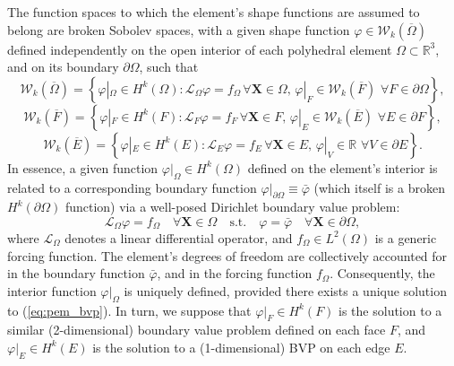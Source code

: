 	The function spaces to which the element's shape functions are assumed to belong are broken Sobolev spaces, with a given shape function $\varphi \in \mathcal{W}_k (\overline{\Omega})$ defined independently on the open interior of each polyhedral element $\Omega \subset \mathbb{R}^3$, and on its boundary $\partial \Omega$, such that
	\begin{equation}
		\mathcal{W}_k (\overline{\Omega}) = \left\{ \varphi|_{\Omega} \in H^k (\Omega) : \mathcal{L}_{\Omega} \varphi = f_{\Omega}  \, \forall \bm{X} \in \Omega, \, \varphi|_{F} \in \mathcal{W}_k (\overline{F}) \, \, \forall F \in \partial \Omega \right\},
	\end{equation}
	\begin{equation}
		\mathcal{W}_k (\overline{F}) = \left\{ \varphi|_{F} \in H^k (F) : \mathcal{L}_{F} \varphi = f_{F}  \, \forall \bm{X} \in  F, \, \varphi|_{E} \in \mathcal{W}_k (\overline{E}) \, \, \forall E \in \partial F \right\},
	\end{equation}
	\begin{equation}
		\mathcal{W}_k (\overline{E}) = \left\{ \varphi|_{E} \in H^k (E) : \mathcal{L}_{E} \varphi = f_{E}  \, \forall \bm{X} \in  E, \, \varphi|_{V} \in \mathbb{R} \, \, \forall V \in \partial E \right\}.
	\end{equation}
	In essence, a given function $\varphi|_{\Omega} \in H^k (\Omega)$ defined on the element's interior is related to a corresponding boundary function $\varphi|_{\partial \Omega} \equiv \bar{\varphi}$ (which itself is a broken $H^k (\partial \Omega)$ function) via a well-posed Dirichlet boundary value problem:
	\begin{equation}
		\mathcal{L}_{\Omega} \varphi = f_{\Omega} \quad \forall \bm{X} \in \Omega \quad \text{s.t.} \quad \varphi = \bar{\varphi} \quad \forall \bm{X} \in \partial \Omega,
		\label{eq:pem_bvp}
	\end{equation}
	where $\mathcal{L}_{\Omega}$ denotes a linear differential operator, and $f_{\Omega} \in L^2 (\Omega)$ is a generic forcing function. The element's degrees of freedom are collectively accounted for in the boundary function $\bar{\varphi}$, and in the forcing function $f_{\Omega}$. Consequently, the interior function $\varphi|_{\Omega}$ is uniquely defined, provided there exists a unique solution to (\ref{eq:pem_bvp}). In turn, we suppose that $\varphi|_{F} \in H^k(F)$ is the solution to a similar (2-dimensional) boundary value problem defined on each face $F$, and $\varphi|_E \in H^k(E)$ is the solution to a (1-dimensional) BVP on each edge $E$.
	
